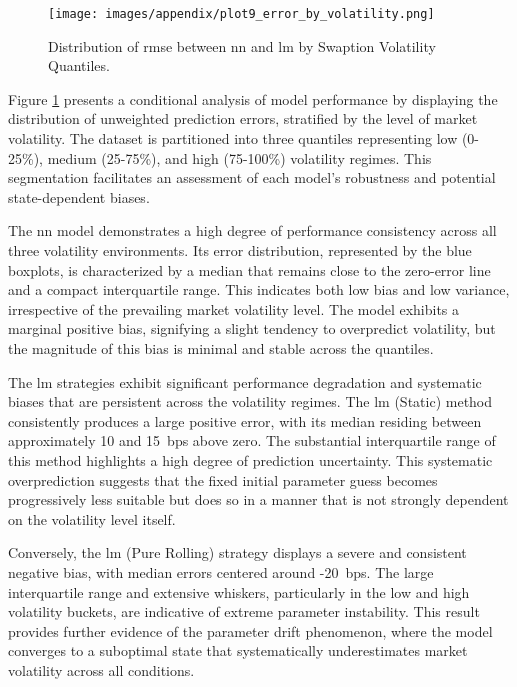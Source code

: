 \begin{figure}[H]
	\centering
	\texttt{[image: images/appendix/plot9\_error\_by\_volatility.png]}
	\caption{Distribution of \ac{rmse} between \ac{nn} and \ac{lm} by Swaption Volatility Quantiles.}
	\label{fig:distribution_rmse_by_swaption_volatility_quantile}
\end{figure}

Figure \ref{fig:distribution_rmse_by_swaption_volatility_quantile} presents a conditional analysis of model performance by displaying the distribution of unweighted prediction errors, stratified by the level of market volatility. The dataset is partitioned into three quantiles representing low (0-25\%), medium (25-75\%), and high (75-100\%) volatility regimes. This segmentation facilitates an assessment of each model's robustness and potential state-dependent biases.

The \ac{nn} model demonstrates a high degree of performance consistency across all three volatility environments. Its error distribution, represented by the blue boxplots, is characterized by a median that remains close to the zero-error line and a compact interquartile range. This indicates both low bias and low variance, irrespective of the prevailing market volatility level. The model exhibits a marginal positive bias, signifying a slight tendency to overpredict volatility, but the magnitude of this bias is minimal and stable across the quantiles.

The \ac{lm} strategies exhibit significant performance degradation and systematic biases that are persistent across the volatility regimes. The \ac{lm} (Static) method consistently produces a large positive error, with its median residing between approximately 10 and 15~\ac{bps} above zero. The substantial interquartile range of this method highlights a high degree of prediction uncertainty. This systematic overprediction suggests that the fixed initial parameter guess becomes progressively less suitable but does so in a manner that is not strongly dependent on the volatility level itself.

Conversely, the \ac{lm} (Pure Rolling) strategy displays a severe and consistent negative bias, with median errors centered around -20~\ac{bps}. The large interquartile range and extensive whiskers, particularly in the low and high volatility buckets, are indicative of extreme parameter instability. This result provides further evidence of the parameter drift phenomenon, where the model converges to a suboptimal state that systematically underestimates market volatility across all conditions.

